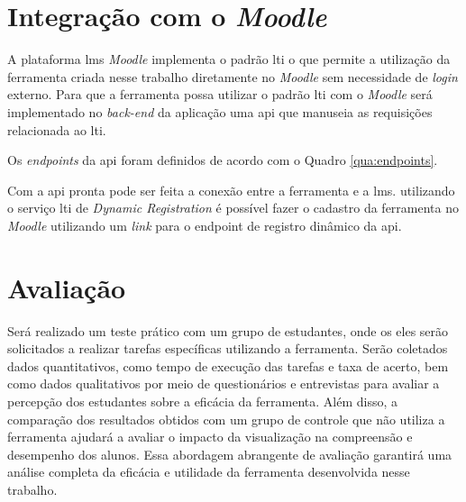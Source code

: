\section{Integração com o \textit{Moodle}}
A plataforma \gls{lms} \textit{Moodle} implementa o padrão \gls{lti} o que permite a utilização da ferramenta criada nesse trabalho diretamente no \textit{Moodle} sem necessidade de \textit{login} externo. Para que a ferramenta possa utilizar o padrão \gls{lti} com o \textit{Moodle} será implementado no \textit{back-end} da aplicação uma \gls{api} que manuseia as requisições relacionada ao \gls{lti}. 

Os \textit{endpoints} da \gls{api} foram definidos de acordo com o Quadro \ref{qua:endpoints}.

\setlength{\abovecaptionskip}{10pt plus 0pt minus 0pt}
\setlength{\belowcaptionskip}{5pt plus 0pt minus 0pt}
\begin{table}[h]
\centering\setlength{\extrarowheight}{2pt}
\label{qua:endpoints}
{}
\end{table}

Com a \gls{api} pronta pode ser feita a conexão entre a ferramenta e a \gls{lms}. utilizando o serviço \gls{lti} de \textit{Dynamic Registration} é possível fazer o cadastro da ferramenta no \textit{Moodle} utilizando um \textit{link} para o endpoint de registro dinâmico da \gls{api}.

\section{Avaliação}
Será realizado um teste prático com um grupo de estudantes, onde os eles serão solicitados a realizar tarefas específicas utilizando a ferramenta. Serão coletados dados quantitativos, como tempo de execução das tarefas e taxa de acerto, bem como dados qualitativos por meio de questionários e entrevistas para avaliar a percepção dos estudantes sobre a eficácia da ferramenta. Além disso, a comparação dos resultados obtidos com um grupo de controle que não utiliza a ferramenta ajudará a avaliar o impacto da visualização na compreensão e desempenho dos alunos. Essa abordagem abrangente de avaliação garantirá uma análise completa da eficácia e utilidade da ferramenta desenvolvida nesse trabalho.

